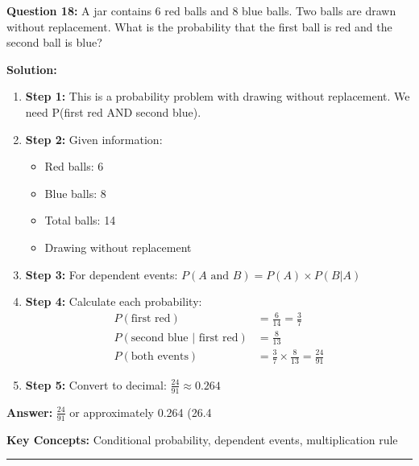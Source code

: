 \textbf{Question 18:} A jar contains 6 red balls and 8 blue balls. Two balls are drawn without replacement. What is the probability that the first ball is red and the second ball is blue?

\textbf{Solution:}
\begin{enumerate}
\item \textbf{Step 1:} This is a probability problem with drawing without replacement. We need P(first red AND second blue).

\item \textbf{Step 2:} Given information:
\begin{itemize}
\item Red balls: 6
\item Blue balls: 8
\item Total balls: 14
\item Drawing without replacement
\end{itemize}

\item \textbf{Step 3:} For dependent events: $P(A \text{ and } B) = P(A) \times P(B|A)$

\item \textbf{Step 4:} Calculate each probability:
\begin{align}
P(\text{first red}) &= \frac{6}{14} = \frac{3}{7} \\
P(\text{second blue | first red}) &= \frac{8}{13} \\
P(\text{both events}) &= \frac{3}{7} \times \frac{8}{13} = \frac{24}{91}
\end{align}

\item \textbf{Step 5:} Convert to decimal: $\frac{24}{91} \approx 0.264$
\end{enumerate}

\textbf{Answer:} $\frac{24}{91}$ or approximately 0.264 (26.4%

\textbf{Key Concepts:} Conditional probability, dependent events, multiplication rule

\hrule
\vspace{1em}
